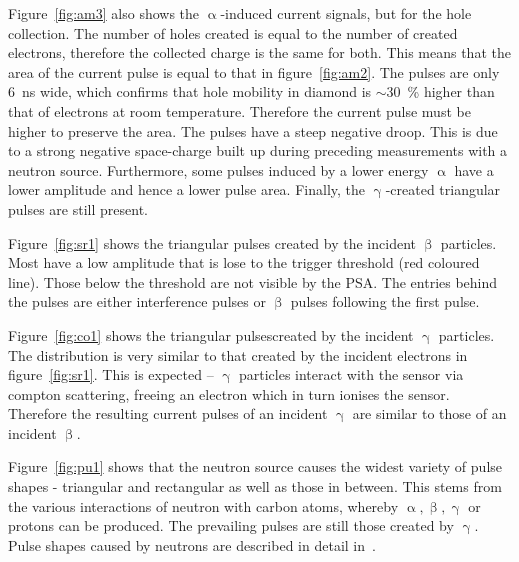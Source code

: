 Figure~\ref{fig:am3} also shows the $\upalpha$-induced current signals, but for the hole collection. The number of holes created is equal to the number of created electrons, therefore the collected charge is the same for both. This means that the area of the current pulse is equal to that in figure~\ref{fig:am2}. The pulses are only 6~ns wide, which confirms that hole mobility in diamond is $\sim$30~\% higher than that of electrons at room temperature. Therefore the current pulse must be higher to preserve the area. The pulses have a steep negative droop. This is due to a strong negative space-charge built up during preceding measurements with a neutron source. Furthermore, some pulses induced by a lower energy $\upalpha$ have a lower amplitude and hence a lower pulse area. Finally, the $\upgamma$-created triangular pulses are still present. 

Figure~\ref{fig:sr1} shows the triangular pulses created by the incident $\upbeta$ particles. Most have a low amplitude that is lose to the trigger threshold (red coloured line). Those below the threshold are not visible by the PSA. The entries behind the pulses are either interference pulses or $\upbeta$ pulses following the first pulse.

Figure~\ref{fig:co1} shows the triangular pulsescreated by the incident $\upgamma$ particles. The distribution is very similar to that created by the incident electrons in figure~\ref{fig:sr1}. This is expected -- $\upgamma$ particles interact with the sensor via compton scattering, freeing an electron which in turn ionises the sensor. Therefore the resulting current pulses of an incident $\upgamma$ are similar to those of an incident $\upbeta$.

Figure~\ref{fig:pu1} shows that the neutron source causes the widest variety of pulse shapes - triangular and rectangular as well as those in between. This stems from the various interactions of neutron with carbon atoms, whereby $\upalpha, \upbeta, \upgamma$ or protons can be produced. The prevailing pulses are still those created by $\upgamma$. %
Pulse shapes caused by neutrons are described in detail in~\cite{PAVEL:00003, CHRISSI:00005}. 







